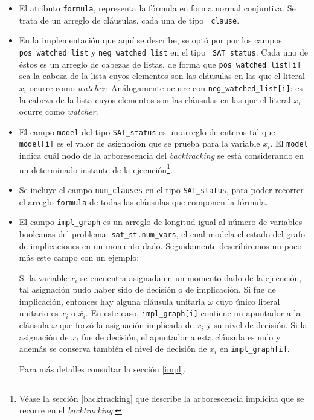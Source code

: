 \documentclass[12pt,lettersize,oneside]{article}
\begin{document}
\begin{itemize}
\item El atributo {\tt formula}, representa la fórmula en forma normal
  conjuntiva. Se trata de un arreglo de cláusulas, cada una de tipo {\tt
    clause}.
\item En la implementación que aquí se describe, se optó por por los campos {\tt
    pos\_watched\_list} y {\tt neg\_watched\_list} en el tipo {\tt
    SAT\_status}. Cada uno de éstos es un arreglo de cabezas de listas, de forma
  que {\tt pos\_watched\_list[i]} sea la cabeza de la lista cuyos elementos son
  las cláusulas en las que el literal $x_i$ ocurre como
  \emph{watcher}. Análogamente ocurre con {\tt neg\_watched\_list[i]}: es la
  cabeza de la lista cuyos elementos son las cláusulas en las que el literal
  $\overline{x_i}$ ocurre como \emph{watcher}.

\item El campo {\tt model} del tipo {\tt SAT\_status} es un arreglo de enteros
  tal que {\tt model[i]} es el valor de asignación que se prueba para la
  variable $x_i$. El {\tt model} indica cuál nodo de la arborescencia del
  \emph{backtracking} se está considerando en un determinado instante de la
  ejecución\footnote{Véase la sección \ref{backtracking} que describe la
    arborescencia implícita que se recorre en el \emph{backtracking}.}.

\item Se incluye el campo {\tt num\_clauses} en el tipo {\tt SAT\_status}, para
  poder recorrer el arreglo {\tt formula} de todas las cláusulas que componen la
  fórmula.

\item El campo {\tt impl\_graph} es un arreglo de longitud igual al número de
  variables booleanas del problema: {\tt sat\_st.num\_vars}, el cual modela el
  estado del grafo de implicaciones en un momento dado. Seguidamente
  describiremos un poco más este campo con un ejemplo:

  Si la variable $x_i$ se encuentra asignada en un momento dado de la ejecución,
  tal asignación pudo haber sido de decisión o de implicación. Si fue de
  implicación, entonces hay alguna cláusula unitaria $\omega$ cuyo único literal
  unitario es $x_i$ o $\overline{x_i}$. En este caso, {\tt impl\_graph[i]}
  contiene un apuntador a la cláusula $\omega$ que forzó la asignación implicada
  de $x_i$ y su nivel de decisión. Si la asignación de $x_i$ fue de decisión, el
  apuntador a esta cláusula es nulo y además se conserva también el nivel de
  decisión de $x_i$ en {\tt impl\_graph[i]}.

  Para más detalles consultar la sección \ref{impl}.

\end{itemize}
\end{document}
